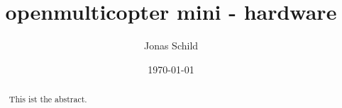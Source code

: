 \documentclass[11pt, a4paper]{article}
\title{openmulticopter mini - hardware}
\author{Jonas Schild}
\date{\today}
\begin{document}
\maketitle

\begin{abstract}
    This ist the abstract.
\end{abstract}

\newpage

\tableofcontents
\end{document}
